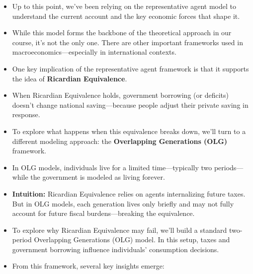 \documentclass[12pt]{article}
\begin{document}
\begin{itemize}
\item Up to this point, we've been relying on the representative agent model to understand the current account and the key economic forces that shape it.

\item While this model forms the backbone of the theoretical approach in our course, it’s not the only one. There are other important frameworks used in macroeconomics—especially in international contexts.

\item One key implication of the representative agent framework is that it supports the idea of \textbf{Ricardian Equivalence}.

\item When Ricardian Equivalence holds, government borrowing (or deficits) doesn't change national saving—because people adjust their private saving in response.

\item To explore what happens when this equivalence breaks down, we’ll turn to a different modeling approach: the \textbf{Overlapping Generations (OLG)} framework.

\item In OLG models, individuals live for a limited time—typically two periods—while the government is modeled as living forever.

\item \textbf{Intuition:} Ricardian Equivalence relies on agents internalizing future taxes. But in OLG models, each generation lives only briefly and may not fully account for future fiscal burdens—breaking the equivalence.
\end{itemize}

\begin{itemize}
\item To explore why Ricardian Equivalence may fail, we’ll build a standard two-period Overlapping Generations (OLG) model. In this setup, taxes and government borrowing influence individuals' consumption decisions.

\item From this framework, several key insights emerge:
\end{itemize}
\end{document}

